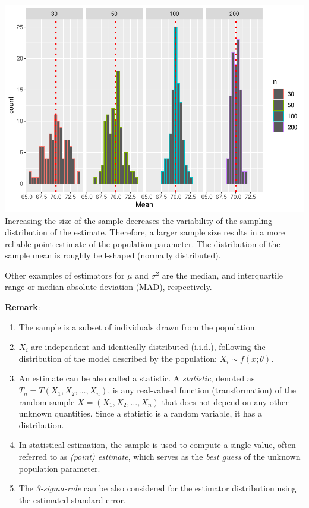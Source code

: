 \documentclass[
]{article}
\begin{document}
\includegraphics{Estimation-and-Confidence-intervals_files/figure-latex/unnamed-chunk-7-1.pdf}
Increasing the size of the sample decreases the variability of the
sampling distribution of the estimate. Therefore, a larger sample size
results in a more reliable point estimate of the population parameter.
The distribution of the sample mean is roughly bell-shaped (normally
distributed).

Other examples of estimators for \(\mu\) and \(\sigma^2\) are the
median, and interquartile range or median absolute deviation (MAD),
respectively.

\textbf{Remark}:

\begin{enumerate}
\def\labelenumi{(\roman{enumi})}
\item
  The sample is a subset of individuals drawn from the population.
\item
  \(X_i\) are independent and identically distributed (i.i.d.),
  following the distribution of the model described by the population:
  \(X_i \sim f(x;\theta)\).
\item
  An estimate can be also called a statistic. A \emph{statistic},
  denoted as \(T_n=T(X_1,X_2,\ldots,X_n)\), is any real-valued function
  (transformation) of the random sample \(X=(X_1,X_2,\ldots,X_n)\) that
  does not depend on any other unknown quantities. Since a statistic is
  a random variable, it has a distribution.
\item
  In statistical estimation, the sample is used to compute a single
  value, often referred to as \emph{(point) estimate}, which serves as
  the \emph{best guess} of the unknown population parameter.
\item
  The \emph{3-sigma-rule} can be also considered for the estimator
  distribution using the estimated standard error.
\end{enumerate}
\end{document}
